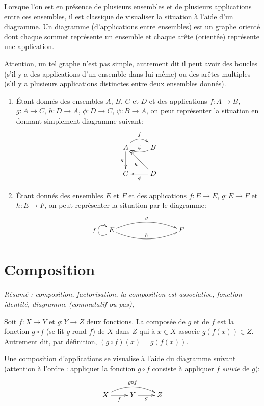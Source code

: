 \begin{definition}[Diagramme]
Lorsque l'on est en présence de plusieurs ensembles et de plusieurs applications entre ces ensembles, il est classique de visualiser la situation à l'aide d'un diagramme. Un diagramme (d'applications entre ensembles) est un graphe orienté dont chaque sommet représente un ensemble et chaque arête (orientée) représente une application.
\end{definition}

Attention, un tel graphe n'est pas simple, autrement dit il peut avoir des boucles (s'il y a des applications d'un ensemble dans lui-même) ou des arêtes multiples (s'il y a plusieurs applications distinctes entre deux ensembles donnés).

\begin{exemple}
\begin{enumerate}
\item \'Etant donnés des ensembles $A$, $B$, $C$ et $D$ et des applications $f : A\to B$, $g : A\to C$, $h : D\to A$, $\phi : D\to C$, $\psi : B\to A$, on peut représenter la situation en donnant simplement diagramme suivant:
\[
\xymatrix{
A \ar@/^1pc/[r]^{f} \ar[d]_{g} & B \ar@/^/[l]_{\psi}\\
C & D \ar[ul]^{h} \ar[l]^{\phi}
}
\]
\item \'Etant donnés des ensembles $E$ et $F$ et des applications $f : E\to E$, $g : E\to F$ et $h : E\to F$, on peut représenter la situation par le diagramme:
\[
\xymatrix{
 E \ar@(dl,ul)^{f} \ar@/^1pc/[rrr]^{g} \ar@/_1pc/[rrr]^{h}
& & &  F 
}
\]
\end{enumerate}
\end{exemple}



\section{Composition}

\emph{Résumé : composition, factorisation, la composition est associative, fonction identité, diagramme (commutatif ou pas), }




\begin{definition}[Composition]
Soit $f : X\to Y$ et $g : Y\to Z$ deux fonctions. La composée de $g$ et de $f$ est la fonction $g\circ f$ (se lit \og $g$ rond $f$\fg) de $X$ dans $Z$ qui à $x\in X$ associe $g(f(x)) \in Z$. Autrement dit, par définition, $(g\circ f)(x) = g(f(x))$.

Une composition d'applications se visualise à l'aide du diagramme suivant (attention à l'ordre : appliquer la fonction $g\circ f$ consiste à appliquer $f$ \emph{suivie} de $g$):
\[
\xymatrix{
X \ar[r]_{f} \ar@/^1pc/[rr]^{g\circ f}& Y \ar[r]_{g}& Z
}
\]
\end{definition}

